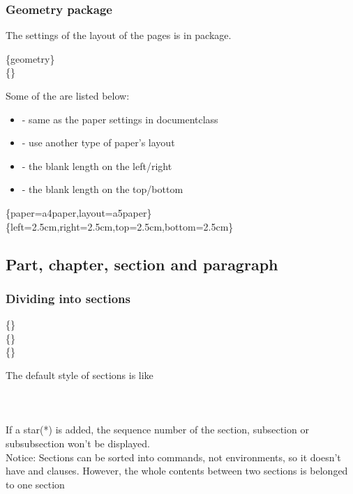 \begin{frame}
	\frametitle{Geometry package}
	The settings of the layout of the pages is in  package.
	\begin{command}
		\{geometry\}\\
		\{\}
	\end{command}
	Some of the  are listed below:
	\begin{itemize}
		\item {} - same as the paper settings in documentclass
		\item {} - use another type of paper's layout
		\item {} - the blank length on the left/right
		\item {} - the blank length on the top/bottom
	\end{itemize}
	\begin{example}
		\{paper=a4paper,layout=a5paper\}
		\{left=2.5cm,right=2.5cm,top=2.5cm,bottom=2.5cm\}
	\end{example}
\end{frame}

\subsection{Part, chapter, section and paragraph}

\begin{frame}
	\frametitle{Dividing into sections}
	\begin{command}
		\{\structure{name}\}\\
		\{\structure{name}\}\\
		\{\structure{name}\}\\
	\end{command}
	The default style of sections is like\\
	\\
	\\
	\\[0.5em]
	If a star(\alert{*}) is added, the sequence number of the section, subsection or subsubsection won't be displayed.\\
	\alert{Notice:} Sections can be sorted into commands, not environments, so it doesn't have  and  clauses. However, the whole contents between two sections is belonged to one section
\end{frame}

